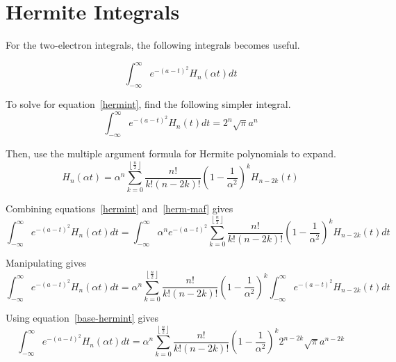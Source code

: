 \documentclass{article}
\begin{document}
\section{Hermite Integrals}

For the two-electron integrals, the following integrals becomes useful.

\begin{equation}
  \int_{-\infty}^\infty e^{-\left(a - t\right)^2} H_{n}\left(\alpha t\right) dt
  \label{hermint}
\end{equation}

To solve for equation~\ref{hermint}, find the following simpler integral.
\begin{equation}
  \int_{-\infty}^\infty e^{-\left(a - t\right)^2} H_{n}\left(t\right) dt = 2^n \sqrt{\pi} a^n
  \label{base-hermint}
\end{equation}

Then, use the multiple argument formula for Hermite polynomials to expand.
\begin{equation}
  H_n(\alpha t) = \alpha^n \sum_{k = 0}^{\left\lfloor\frac{n}{2}\right\rfloor}\frac{n!}{k!(n - 2k)!}\left(1 - \frac{1}{\alpha^2}\right)^k H_{n - 2k}(t)
  \label{herm-maf}
\end{equation}

Combining equations~\ref{hermint} and~\ref{herm-maf} gives
\begin{equation}
  \int_{-\infty}^\infty e^{-(a - t)^2} H_n(\alpha t) dt = \int_{-\infty}^\infty \alpha^n e^{-(a - t)^2} \sum_{k = 0}^{\left\lfloor\frac{n}{2}\right\rfloor} \frac{n!}{k!(n - 2k)!}\left(1 - \frac{1}{\alpha^2}\right)^k H_{n - 2k}(t) dt
  \label{herm-comb}
\end{equation}

Manipulating gives
\begin{equation}
  \int_{-\infty}^\infty e^{-(a - t)^2} H_n(\alpha t) dt = \alpha^n \sum_{k = 0}^{\left\lfloor\frac{n}{2}\right\rfloor} \frac{n!}{k!(n - 2k)!}\left(1 - \frac{1}{\alpha^2}\right)^k \int_{-\infty}^\infty e^{-(a - t)^2} H_{n - 2k}(t) dt
  \label{herm-comb-2}
\end{equation}

Using equation~\ref{base-hermint} gives
\begin{equation}
  \int_{-\infty}^\infty e^{-(a - t)^2} H_n(\alpha t) dt = \alpha^n \sum_{k = 0}^{\left\lfloor\frac{n}{2}\right\rfloor} \frac{n!}{k!(n - 2k)!}\left(1 - \frac{1}{\alpha^2}\right)^k 2^{n - 2k} \sqrt{\pi} a^{n - 2k}
  \label{herm-integrated}
\end{equation}
\end{document}
